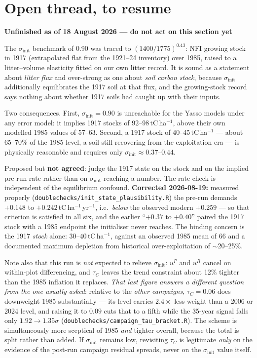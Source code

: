 \documentclass[11pt]{article}
\newenvironment{warnbox}[1][]{%
  \begin{leftbar}\noindent\textcolor{red!60!black}{\textbf{\small #1}}\par\vspace{0.3em}\small}{\end{leftbar}}
\begin{document}
\section{Open thread, to resume}

\begin{warnbox}[Unfinished as of 18 August 2026 --- do not act on this section yet]
The $\sigma_{\text{init}}$ benchmark of 0.90 was traced to
$(1400/1775)^{0.43}$: NFI growing stock in 1917 (extrapolated flat from the 1921--24
inventory) over 1985, raised to a litter--volume elasticity fitted on our own litter
record. It is sound as a statement about \emph{litter flux} and over-strong as one
about \emph{soil carbon stock}, because $\sigma_{\text{init}}$ additionally
equilibrates the 1917 soil at that flux, and the growing-stock record says nothing
about whether 1917 soils had caught up with their inputs.

Two consequences. First, $\sigma_{\text{init}} = 0.90$ is unreachable for the Yasso
models under any error model: it implies 1917 stocks of 92--98\,tC\,ha$^{-1}$, above
their own modelled 1985 values of 57--63. Second, a 1917 stock of
40--45\,tC\,ha$^{-1}$ --- about 65--70\% of the 1985 level, a soil still recovering
from the exploitation era --- is physically reasonable and requires only
$\sigma_{\text{init}} \approx 0.37$--$0.44$.

Proposed but \textbf{not agreed}: judge the 1917 state on the stock and on the
implied pre-run rate rather than on $\sigma_{\text{init}}$ reaching a number. The
rate check is independent of the equilibrium confound. \textbf{Corrected 2026-08-19:}
measured properly (\texttt{doublechecks/init\_state\_plausibility.R}) the pre-run demands
$+0.148$ to $+0.242$\,tC\,ha$^{-1}$\,yr$^{-1}$, i.e.\ \emph{below} the observed modern
$+0.259$ --- so that criterion is satisfied in all six, and the earlier
``$+0.37$ to $+0.40$'' paired the 1917 stock with a 1985 endpoint the initialiser never
reaches. The binding concern is the 1917 \emph{stock} alone: $30$--$40$\,tC\,ha$^{-1}$,
against an observed 1985 mean of $66$ and a documented maximum depletion from historical
over-exploitation of $\sim$20--25\%.

Note also that this run is \emph{not} expected to relieve $\sigma_{\text{init}}$:
$u^{P}$ and $u^{R}$ cancel on within-plot differencing, and $\tau_C$ leaves the trend
constraint about 12\% tighter than the 1985 inflation it replaces. \emph{That last
figure answers a different question from the one usually asked}: relative to the
\emph{other campaigns}, $\tau_C = 0.06$ does downweight 1985 substantially --- its
level carries $2.4\times$ less weight than a 2006 or 2024 level, and raising it to
$0.09$ cuts that to a fifth while the 35-year signal falls only $1.92 \to 1.35\sigma$
(\texttt{doublechecks/campaign\_tau\_bracket.R}). The scheme is simultaneously more
sceptical of 1985 \emph{and} tighter overall, because the total is split rather than
added. If
$\sigma_{\text{init}}$ remains low, revisiting $\tau_C$ is legitimate \emph{only}
on the evidence of the post-run campaign residual spreads, never on the
$\sigma_{\text{init}}$ value itself.
\end{warnbox}
\end{document}
